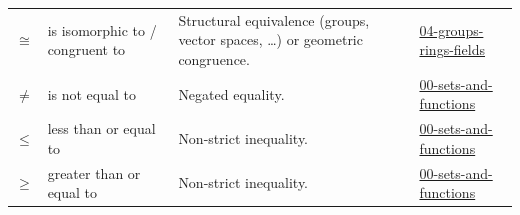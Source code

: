 \documentclass[10pt]{article}
\begin{document}
\begin{longtable}{@{} >{$}c<{$} l p{6.5cm} l @{}}
\cong & is isomorphic to / congruent to & Structural equivalence (groups, vector spaces, \ldots{}) or geometric congruence. & \href{https://github.com/pleyva2004/math-foundations/tree/main/concepts/04-groups-rings-fields}{04-groups-rings-fields} \\
\neq & is not equal to & Negated equality. & \href{https://github.com/pleyva2004/math-foundations/tree/main/concepts/00-sets-and-functions}{00-sets-and-functions} \\
\leq & less than or equal to & Non-strict inequality. & \href{https://github.com/pleyva2004/math-foundations/tree/main/concepts/00-sets-and-functions}{00-sets-and-functions} \\
\geq & greater than or equal to & Non-strict inequality. & \href{https://github.com/pleyva2004/math-foundations/tree/main/concepts/00-sets-and-functions}{00-sets-and-functions} \\
\end{longtable}
\end{document}
